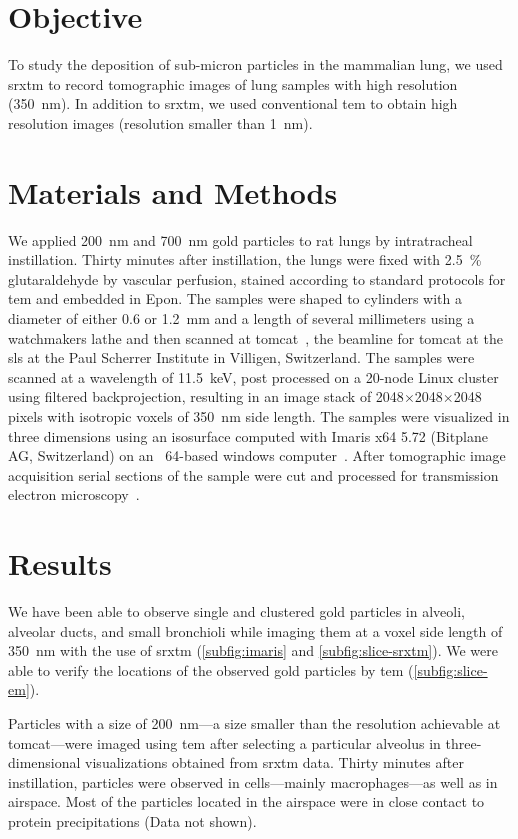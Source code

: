 \section{Objective}
To study the deposition of sub-micron particles in the mammalian lung, we used \ac{srxtm} to record tomographic images of lung samples with high resolution (\SI{350}{\nano\meter}). In addition to \ac{srxtm}, we used conventional \ac{tem} to obtain high resolution images (resolution smaller than \SI{1}{\nano\meter}).

\section{Materials and Methods}
We applied \SI{200}{\nano\meter} and \SI{700}{\nano\meter} gold particles to rat lungs by intratracheal instillation. Thirty minutes after instillation, the lungs were fixed with \SI{2.5}{\%} glutaraldehyde by vascular perfusion, stained according to standard protocols for \ac{tem} and embedded in Epon. The samples were shaped to cylinders with a diameter of either 0.6 or \SI{1.2}{\milli\meter} and a length of several millimeters using a watchmakers lathe and then scanned at \ac{tomcat}~\cite{Stampanoni2007}, the beamline for \acl{tomcat} at the \acl{sls} at the Paul Scherrer Institute in Villigen, Switzerland. The samples were scanned at a wavelength of \SI{11.5}{\kilo\electronvolt}, post processed on a 20-node Linux cluster using filtered backprojection, resulting in an image stack of 2048$\times$2048$\times$2048 pixels with isotropic voxels of \SI{350}{\nano\meter} side length. The samples were visualized in three dimensions using an isosurface computed with Imaris x64 5.72 (Bitplane AG, Switzerland) on an ~64-based windows computer~\cite{Tsuda2008}. After tomographic image acquisition serial sections of the sample were cut and processed for transmission electron microscopy~\cite{Mund2008}. 

\section{Results}
We have been able to observe single and clustered gold particles in alveoli, alveolar ducts, and small bronchioli while imaging them at a voxel side length of \SI{350}{\nano\meter} with the use of \ac{srxtm} (\autoref{subfig:imaris} and \ref{subfig:slice-srxtm}). We were able to verify the locations of the observed gold particles by \ac{tem} (\autoref{subfig:slice-em}). 

Particles with a size of \SI{200}{\nano\meter}---a size smaller than the resolution achievable at \ac{tomcat}---were imaged using \ac{tem} after selecting a particular alveolus in three-dimensional visualizations obtained from \ac{srxtm} data. Thirty minutes after instillation, particles were observed in cells---mainly macrophages---as well as in airspace. Most of the particles located in the airspace were in close contact to protein precipitations (Data not shown).

